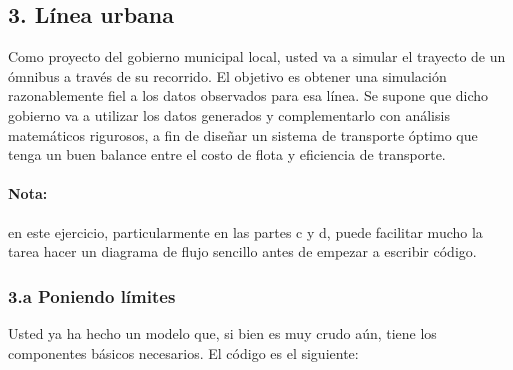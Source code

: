 \documentclass[]{article}
\begin{document}
\subsection{3. Línea urbana}

Como proyecto del gobierno municipal local, usted va a simular el
trayecto de un ómnibus a través de su recorrido. El objetivo es obtener
una simulación razonablemente fiel a los datos observados para esa
línea. Se supone que dicho gobierno va a utilizar los datos generados y
complementarlo con análisis matemáticos rigurosos, a fin de diseñar un
sistema de transporte óptimo que tenga un buen balance entre el costo de
flota y eficiencia de transporte.

\paragraph{Nota:}

en este ejercicio, particularmente en las partes c y d, puede facilitar
mucho la tarea hacer un diagrama de flujo sencillo antes de empezar a
escribir código.

\subsubsection{3.a Poniendo límites}

Usted ya ha hecho un modelo que, si bien es muy crudo aún, tiene los
componentes básicos necesarios. El código es el siguiente:
\end{document}
